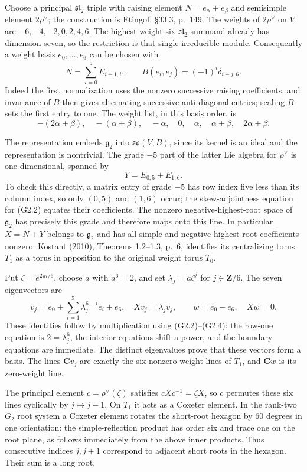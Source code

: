 \documentclass[11pt,a4paper]{article}
\theoremstyle{definition}\newtheorem{definition}[theorem]{Definition}
\theoremstyle{remark}\newtheorem{remark}[theorem]{Remark}
\begin{document}
Choose a principal $\mathfrak{sl}_2$ triple with raising element
$N=e_\alpha+e_\beta$ and semisimple element $2\rho^\vee$;
the construction is Etingof, \S33.3, p.~149.  The weights of
$2\rho^\vee$ on $V$ are $-6,-4,-2,0,2,4,6$.
The highest-weight-six $\mathfrak{sl}_2$ summand already has
dimension seven, so the restriction is that single irreducible
module.  Consequently a weight basis $e_0,\ldots,e_6$ can be
chosen with
\[
 N=\sum_{i=0}^{5}E_{i+1,i},\qquad
 B(e_i,e_j)=(-1)^i\delta_{i+j,6}.
 \tag{G2.2}
\]
Indeed the first normalization uses the nonzero successive raising
coefficients, and invariance of $B$ then gives alternating successive
anti-diagonal entries; scaling $B$ sets the first entry to one.
The weight list, in this basis order, is
\[
 -(2\alpha+\beta),\quad-(\alpha+\beta),\quad-\alpha,
 \quad0,\quad\alpha,\quad\alpha+\beta,\quad2\alpha+\beta.
 \tag{G2.3}
\]

The representation embeds $\mathfrak g_2$ into
$\mathfrak{so}(V,B)$, since its kernel is an ideal and the
representation is nontrivial.  The grade $-5$ part of the latter
Lie algebra for $\rho^\vee$ is one-dimensional, spanned by
\[
                         Y=E_{0,5}+E_{1,6}.
 \tag{G2.4}
\]
To check this directly, a matrix entry of grade $-5$ has row
index five less than its column index, so only $(0,5)$ and
$(1,6)$ occur; the skew-adjointness equation for (G2.2) equates
their coefficients.  The nonzero negative-highest-root space
of $\mathfrak g_2$ has precisely this grade and therefore maps
onto this line.  In particular $X=N+Y$ belongs to
$\mathfrak g_2$ and has all simple and negative-highest-root
coefficients nonzero.  Kostant (2010), Theorems 1.2--1.3,
p.~6, identifies its centralizing torus $T_1$ as a torus in
apposition to the original weight torus $T_0$.

Put $\zeta=e^{2\pi i/6}$, choose $a$ with $a^6=2$, and set
$\lambda_j=a\zeta^j$ for $j\in\mathbf Z/6$.  The seven
eigenvectors are
\[
 v_j=e_0+\sum_{i=1}^{5}\lambda_j^{6-i}e_i+e_6,
       \quad Xv_j=\lambda_jv_j,
       \qquad w=e_0-e_6,\quad Xw=0.
 \tag{G2.5}
\]
These identities follow by multiplication using (G2.2)--(G2.4):
the row-one equation is $2=\lambda_j^6$, the interior equations
shift a power, and the boundary equations are immediate.
The distinct eigenvalues prove that these vectors form a basis.
The lines $\mathbf C v_j$ are exactly the six nonzero weight
lines of $T_1$, and $\mathbf Cw$ is its zero-weight line.

The principal element $c=\rho^\vee(\zeta)$ satisfies
$cXc^{-1}=\zeta X$, so $c$ permutes these six lines cyclically
by $j\mapsto j-1$.  On $T_1$ it acts as a Coxeter element.
In the rank-two $G_2$ root system a Coxeter element rotates the
short-root hexagon by $60$ degrees in one orientation: the
simple-reflection product has order six and trace one on the
root plane, as follows immediately from the above inner products.
Thus consecutive indices $j,j+1$ correspond to adjacent short
roots in the hexagon.  Their sum is a long root.
\end{document}

